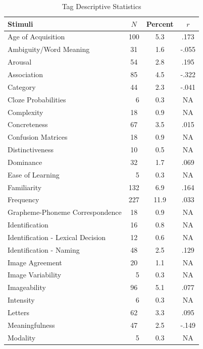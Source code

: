 \documentclass[english,man]{apa6}
\theoremstyle{definition}
\theoremstyle{definition}
\theoremstyle{definition}
\theoremstyle{remark}
\begin{document}
\begin{table}[tbp]
\begin{center}
\begin{threeparttable}
\caption{\label{tab:tag-table}Tag Descriptive Statistics}
\small{
\begin{tabular}{lccc}
\toprule
Stimuli & $N$ & Percent & $r$\\
\midrule
Age of Acquisition & 100 & 5.3 & .173\\
Ambiguity/Word Meaning & 31 & 1.6 & -.055\\
Arousal & 54 & 2.8 & .195\\
Association & 85 & 4.5 & -.322\\
Category & 44 & 2.3 & -.041\\
Cloze Probabilities & \ \ 6 & 0.3 & NA\\
Complexity & 18 & 0.9 & NA\\
Concreteness & 67 & 3.5 & .015\\
Confusion Matrices & 18 & 0.9 & NA\\
Distinctiveness & 10 & 0.5 & NA\\
Dominance & 32 & 1.7 & .069\\
Ease of Learning & \ \ 5 & 0.3 & NA\\
Familiarity & 132 & 6.9 & .164\\
Frequency & 227 & 11.9 & .033\\
Grapheme-Phoneme Correspondence & 18 & 0.9 & NA\\
Identification & 16 & 0.8 & NA\\
Identification - Lexical Decision & 12 & 0.6 & NA\\
Identification - Naming & 48 & 2.5 & .129\\
Image Agreement & 20 & 1.1 & NA\\
Image Variability & \ \ 5 & 0.3 & NA\\
Imageability & 96 & 5.1 & .077\\
Intensity & \ \ 6 & 0.3 & NA\\
Letters & 62 & 3.3 & .095\\
Meaningfulness & 47 & 2.5 & -.149\\
Modality & \ \ 5 & 0.3 & NA\\
\bottomrule
\end{tabular}
}
\end{threeparttable}
\end{center}
\end{table}
\end{document}
